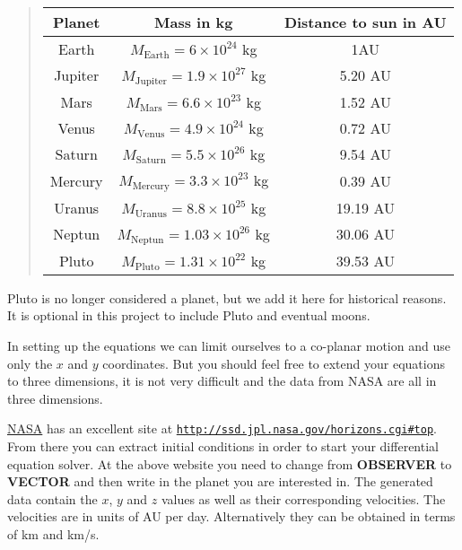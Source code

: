 \documentclass[%
oneside,                 %
final,                   %
10pt]{article}
\begin{document}
\begin{quote}
\begin{tabular}{ccc}
\hline
\multicolumn{1}{c}{ Planet } & \multicolumn{1}{c}{ Mass in kg } & \multicolumn{1}{c}{ Distance to  sun in AU } \\
\hline
Earth   & $M_{\mathrm{Earth}}=6\times 10^{24}$ kg     & 1AU                    \\
Jupiter & $M_{\mathrm{Jupiter}}=1.9\times 10^{27}$ kg & 5.20 AU                \\
Mars    & $M_{\mathrm{Mars}}=6.6\times 10^{23}$ kg    & 1.52 AU                \\
Venus   & $M_{\mathrm{Venus}}=4.9\times 10^{24}$ kg   & 0.72 AU                \\
Saturn  & $M_{\mathrm{Saturn}}=5.5\times 10^{26}$ kg  & 9.54 AU                \\
Mercury & $M_{\mathrm{Mercury}}=3.3\times 10^{23}$ kg & 0.39 AU                \\
Uranus  & $M_{\mathrm{Uranus}}=8.8\times 10^{25}$ kg  & 19.19 AU               \\
Neptun  & $M_{\mathrm{Neptun}}=1.03\times 10^{26}$ kg & 30.06 AU               \\
Pluto   & $M_{\mathrm{Pluto}}=1.31\times 10^{22}$ kg  & 39.53 AU               \\
\hline
\end{tabular}
\end{quote}

\noindent
Pluto is no longer considered a planet, but we add it here for
historical reasons. It is optional in this project to include Pluto
and eventual moons.

In setting up the equations we can limit ourselves to a co-planar
motion and use only the $x$ and $y$ coordinates. But you should feel
free to extend your equations to three dimensions, it is not very
difficult and the data from NASA are all in three dimensions.

\href{{http://www.nasa.gov/index.html}}{NASA} has an excellent site at \href{{http://ssd.jpl.nasa.gov/horizons.cgi#top}}{\nolinkurl{http://ssd.jpl.nasa.gov/horizons.cgi\#top}}.
From there you can extract initial conditions in order to start your differential equation solver.
At the above website you need to change from \textbf{OBSERVER} to \textbf{VECTOR} and then write in the planet you are interested in.
The generated data contain the $x$, $y$ and $z$ values as well as their corresponding velocities. The velocities are in units of AU per day.
Alternatively they can be obtained in terms of km and km/s. 
\end{document}
